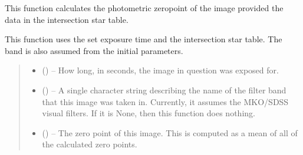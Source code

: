 \documentclass[letterpaper,11pt,english]{sphinxmanual}
\begin{document}
\begin{savenotes}
\begin{fulllineitems}
\begin{savenotes}
\begin{fulllineitems}
\end{fulllineitems}\end{savenotes}


\begin{savenotes}\begin{fulllineitems}
\label{\detokenize{code/opihiexarata.photometry.solution:opihiexarata.photometry.solution.PhotometricSolution._calculate_zero_point}}
\pysigstartsignatures
{}
\pysigstopsignatures
\sphinxAtStartPar
This function calculates the photometric zero\sphinxhyphen{}point of the image
provided the data in the intersection star table.

\sphinxAtStartPar
This function uses the set exposure time and the intersection star
table. The band is also assumed from the initial parameters.
\begin{quote}\begin{description}
\begin{itemize}
\item {} 
\sphinxAtStartPar
{} () – How long, in seconds, the image in question was exposed for.

\item {} 
\sphinxAtStartPar
{} (\sphinxstyleliteralemphasis{\sphinxupquote{, }}) – A single character string describing the name of the filter band that
this image was taken in. Currently, it assumes the MKO/SDSS visual
filters. If it is None, then this function does nothing.

\end{itemize}

\sphinxAtStartPar
\begin{itemize}
\item {} 
\sphinxAtStartPar
{} () – The zero point of this image. This is computed as a mean of all of
the calculated zero points.


\end{itemize}
\end{description}
\end{quote}
\end{fulllineitems}
\end{savenotes}
\end{fulllineitems}
\end{savenotes}
\end{document}
